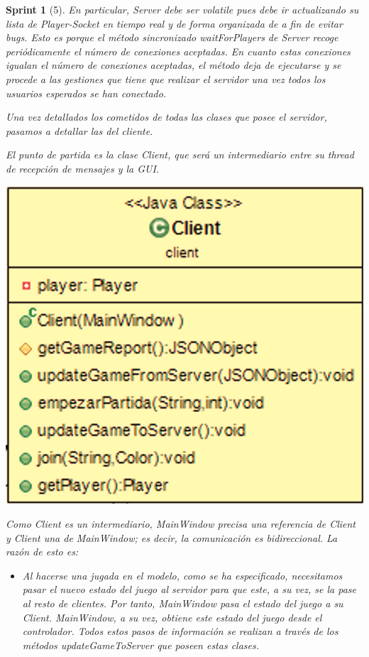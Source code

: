 \documentclass[12pt,a4paper,openright]{book}
\theoremstyle{break}
\newtheorem*{sprint}{Sprint}
\begin{document}
\begin{sprint}[5]
En particular, Server debe ser volatile pues debe ir actualizando su lista de Player-Socket en tiempo real y de forma organizada de a fin de evitar bugs. Esto es porque el método sincronizado waitForPlayers de Server recoge periódicamente el número de conexiones aceptadas. En cuanto estas conexiones igualan el número de conexiones aceptadas, el método deja de ejecutarse y se procede a las gestiones que tiene que realizar el servidor una vez todos los usuarios esperados se han conectado.

Una vez detallados los cometidos de todas las clases que posee el servidor, pasamos a detallar las del cliente.

El punto de partida es la clase Client, que será un intermediario entre su thread de recepción de mensajes y la GUI.

\begin{center}
\includegraphics[scale=0.3]{Client-sprint5.png} 
\end{center}

Como Client es un intermediario, MainWindow precisa una referencia de Client y Client una de MainWindow; es decir, la comunicación es bidireccional. La razón de esto es:

\begin{itemize}
\item Al hacerse una jugada en el modelo, como se ha especificado, necesitamos pasar el nuevo estado del juego al servidor para que este, a su vez, se la pase al resto de clientes. Por tanto, MainWindow pasa el estado del juego a su Client. MainWindow, a su vez, obtiene este estado del juego desde el controlador. Todos estos pasos de información se realizan a través de los métodos updateGameToServer que poseen estas clases.


\end{itemize}
\end{sprint}
\end{document}
